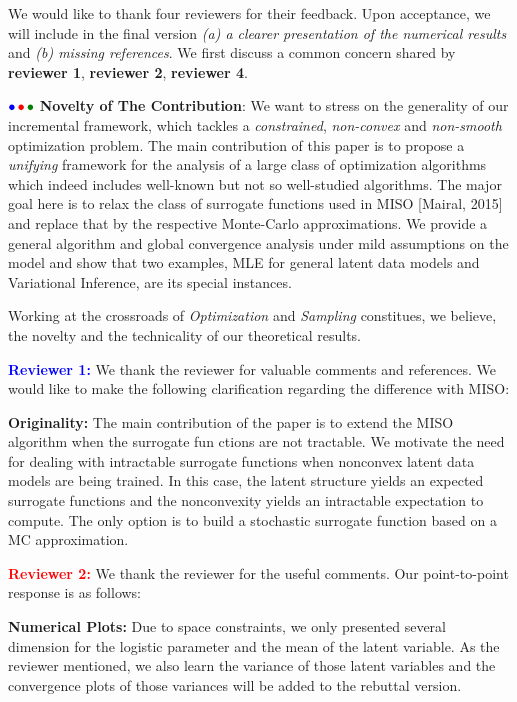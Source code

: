 \documentclass{article}
\begin{document}
We would like to thank four reviewers for their feedback. Upon acceptance, we will include in the final version \emph{{\sf (a)} a clearer presentation of the numerical results} and \emph{{\sf (b)} missing references}. 
We first discuss a common concern shared by \textbf{\color{blue}reviewer 1}, \textbf{\color{red} reviewer 2}, \textbf{\color{green!50!black}reviewer 4}.

${\color{blue}\bullet}\!~{\color{red}\bullet}\!~{\color{green!50!black}\bullet}$ \textbf{Novelty of The Contribution}: 
We want to stress on the generality of our incremental framework, which tackles a \emph{constrained}, \emph{non-convex} and \emph{non-smooth} optimization problem. 
The main contribution of this paper is to propose a \emph{unifying} framework for the analysis of a large class of optimization algorithms which indeed includes well-known but not so well-studied algorithms.
The major goal here is to relax the class of surrogate functions used in MISO [Mairal, 2015] and replace that by the respective Monte-Carlo approximations.
We provide a general algorithm and global convergence analysis under mild assumptions on the model and show that two examples, MLE for general latent data models and Variational Inference, are its special instances.

Working at the crossroads of \emph{Optimization} and \emph{Sampling} constitues, we believe, the novelty and the technicality of our theoretical results.


\textbf{\textcolor{blue}{Reviewer 1:}} We thank the reviewer for valuable comments and references. We would like to make the following clarification regarding the difference with MISO:

\textbf{Originality:} The main contribution of the paper is to extend the MISO algorithm when the surrogate fun
ctions are not tractable. We motivate the need for dealing with intractable surrogate functions when nonconvex latent data models are being trained. In this case, the latent structure yields an expected surrogate functions and the nonconvexity yields an intractable expectation to compute. The only option is to build a stochastic surrogate function based on a MC approximation.


\textbf{\textcolor{red}{Reviewer 2:}} We thank the reviewer for the useful comments. Our point-to-point response is as follows:

\textbf{Numerical Plots:} Due to space constraints, we only presented several dimension for the logistic parameter and the mean of the latent variable. As the reviewer mentioned, we also learn the variance of those latent variables and the convergence plots of those variances will be added to the rebuttal version.
\end{document}
